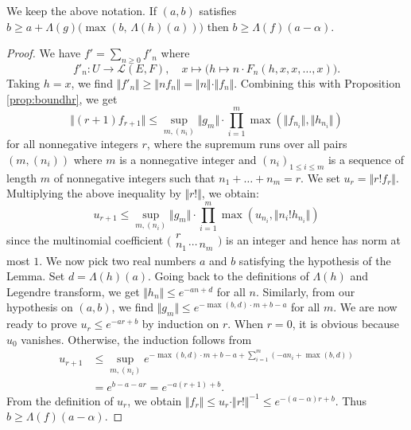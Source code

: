 \documentclass{sig-alternate-2013}
\newcommand{\Z}{\mathbb Z}
\renewcommand{\O}{\mathcal O}
\newcommand{\id}{\textrm{id}}
\def\binom#1#2{\Big(\begin{array}{cc} #1 \\ #2 \end{array}\Big)}
\begin{document}
\begin{lem}
\label{lem:boundLambdaf}
We keep the above notation. 
If $(a,b)$ satisfies
$b \geq a + \Lambda(g)\big( \! \max(b, \, \Lambda(h) (a)) \big)$
then $b \geq \Lambda(f)(a - \alpha)$.
\end{lem}

\begin{proof}
We have $f' = \sum_{n \geq 0} f'_n$ where
$$f'_n : U \to \mathcal L(E,F), \quad
x \mapsto \big(h \mapsto n \cdot F_n(h, x, x, \ldots, x)\big).$$
Taking $h = x$, we find
$\Vert f'_n \Vert \geq \Vert n f_n \Vert = 
\Vert n \Vert \cdot \Vert f_n \Vert$.
Combining this with Proposition \ref{prop:boundhr}, we get
$$\Vert (r+1) f_{r+1} \Vert \leq
  \sup_{m, (n_i)} \Vert g_m \Vert \cdot 
  \prod_{i=1}^m \max(\Vert f_{n_i} \Vert, \Vert h_{n_i} \Vert)$$
for all nonnegative integers $r$,
where the supremum runs over all pairs $(m, (n_i))$ where $m$
is a nonnegative integer and $(n_i)_{1 \leq i \leq m}$ is a sequence of
length $m$ of nonnegative integers such that $n_1 + \ldots + n_m = r$.
We set $u_r = \Vert r! f_r \Vert$. Multiplying the above inequality by
$\Vert r! \Vert$, we obtain:
\begin{equation}
\label{eq:boundurrec}
u_{r+1} \leq
  \sup_{m, (n_i)} \Vert g_m \Vert \cdot 
  \prod_{i=1}^m \max(u_{n_i}, \Vert n_i! h_{n_i} \Vert)
\end{equation}
since the multinomial coefficient $\binom r {\!n_1 \, \cdots \, n_m\!}$
is an integer and hence has norm at most $1$.
We now pick two real numbers $a$ and $b$ satisfying the hypothesis of 
the Lemma. Set $d = \Lambda(h)(a)$. Going back to the definitions of 
$\Lambda (h)$ and Legendre transform, we get $\Vert h_n \Vert \leq e^{- 
a n + d}$ for all $n$.
Similarly, from our hypothesis on $(a,b)$, we find
$\Vert g_m \Vert \leq e^{-\!\max(b,d)\cdot m + b - a}$ for all $m$.
We are now ready to prove $u_r \leq e^{-ar + b}$ by induction on $r$.
When $r = 0$, it is obvious because $u_0$ vanishes. Otherwise, the
induction follows from
\begin{align*}
u_{r+1} 
& \leq \sup_{m, (n_i)}
    e^{ -\max(b,d)\cdot m + b - a + \sum_{i=1}^m (-a n_i + \max(b,d))} \\
& = e^{ b - a - a r } = e^{ -a (r+1) + b}.
\end{align*}
From the definition of $u_r$, we obtain 
$\Vert f_r \Vert \leq u_r \cdot \Vert r! \Vert^{-1} \leq e^{-(a - \alpha) 
r + b}$. Thus $b \geq \Lambda(f)(a - \alpha)$.
\end{proof}

\end{document}
